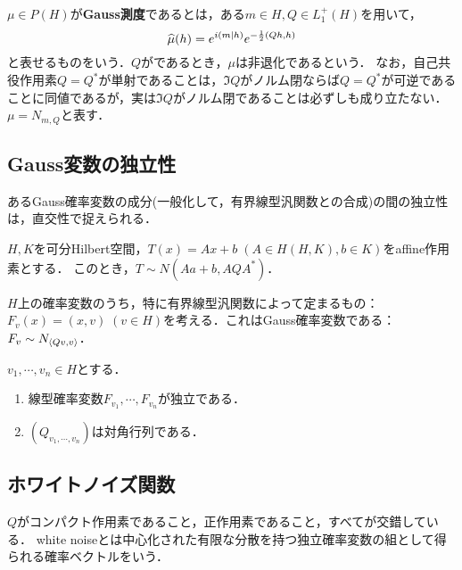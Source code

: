 \documentclass[uplatex,dvipdfmx]{jsreport}
\begin{document}
\begin{definition}
    $\mu\in P(H)$が\textbf{Gauss測度}であるとは，ある$m\in H,Q\in L^+_1(H)$を用いて，
    \[\widehat{\mu}(h)=e^{i(m|h)}e^{-\frac{1}{2}(Qh,h)}\]
    と表せるものをいう．$Q$がであるとき，$\mu$は非退化であるという．
    なお，自己共役作用素$Q=Q^*$が単射であることは，$\Im Q$がノルム閉ならば$Q=Q^*$が可逆であることに同値であるが，実は$\Im Q$がノルム閉であることは必ずしも成り立たない．
    $\mu=N_{m,Q}$と表す．
\end{definition}

\subsection{Gauss変数の独立性}

\begin{tcolorbox}[colframe=ForestGreen, colback=ForestGreen!10!white,breakable,colbacktitle=ForestGreen!40!white,coltitle=black,fonttitle=\bfseries\sffamily,
title=]
    あるGauss確率変数の成分(一般化して，有界線型汎関数との合成)の間の独立性は，直交性で捉えられる．
\end{tcolorbox}

\begin{proposition}[Gauss変数のaffine変換]
    $H,K$を可分Hilbert空間，$T(x)=Ax+b\;(A\in H(H,K),b\in K)$をaffine作用素とする．
    このとき，$T\sim N(Aa+b,AQA^*)$．
\end{proposition}

\begin{notation}
    $H$上の確率変数のうち，特に有界線型汎関数によって定まるもの：$F_v(x)=(x,v)\;(v\in H)$を考える．これはGauss確率変数である：$F_v\sim N_{\langle Qv,v\rangle}$．
\end{notation}

\begin{proposition}[独立性の特徴付け]
    $v_1,\cdots,v_n\in H$とする．
    \begin{enumerate}
        \item 線型確率変数$F_{v_1},\cdots,F_{v_n}$が独立である．
        \item $(Q_{v_1,\cdots,v_n})$は対角行列である．
    \end{enumerate}
\end{proposition}

\subsection{ホワイトノイズ関数}

\begin{tcolorbox}[colframe=ForestGreen, colback=ForestGreen!10!white,breakable,colbacktitle=ForestGreen!40!white,coltitle=black,fonttitle=\bfseries\sffamily,
title=]
    $Q$がコンパクト作用素であること，正作用素であること，すべてが交錯している．
    white noiseとは中心化された有限な分散を持つ独立確率変数の組として得られる確率ベクトルをいう．
\end{tcolorbox}
\end{document}
